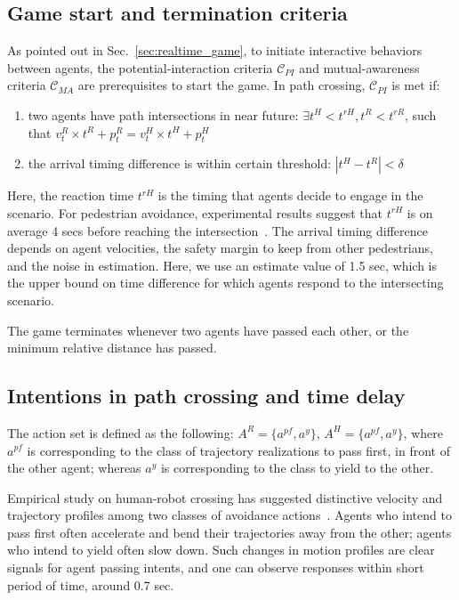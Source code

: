 \documentclass[letterpaper, 10 pt, conference]{ieeeconf}  %
\begin{document}
\subsection{Game start and termination criteria}
\vspace{-.2em}
As pointed out in Sec.~\ref{sec:realtime_game}, to initiate interactive 
behaviors between agents, the potential-interaction criteria $\mathcal{C}_{PI}$ 
and mutual-awareness criteria $\mathcal{C}_{MA}$ are prerequisites to start the 
game. In path crossing, $\mathcal{C}_{PI}$ is met if:
\begin{enumerate}
  \item two agents have path intersections in near future: 
    $\exists t^H<t^{rH}, t^R<t^{rR}$, such that $v^R_t \times t^R + p^R_t = v^H_t \times t^H +p^H_t$
  \item the arrival timing difference is within certain threshold: $|t^H-t^R|<\delta$
\end{enumerate}
Here, the reaction time $t^{rH}$ is the timing that agents decide to 
engage in the scenario. For pedestrian avoidance, experimental results suggest 
that $t^{rH}$ is on average 4 secs before reaching the intersection~\cite{pettre2009experiment}. 
The arrival timing difference depends on agent velocities, the safety margin 
to keep from other pedestrians, and the noise in estimation. Here, we use an 
estimate value of 1.5 sec, which is the upper bound on time difference for 
which agents respond to the intersecting scenario.

The game terminates whenever two agents have passed each other, or the 
minimum relative distance has passed.

\vspace{-.2em}
\subsection{Intentions in path crossing and time delay}
\vspace{-.2em}
The action set is defined as the following: $A^R = \{a^{pf}, a^y\}$, 
$A^H = \{a^{pf},a^y\}$, where $a^{pf}$ is corresponding to the class of 
trajectory realizations to pass first, in front of the other agent; whereas 
$a^y$ is corresponding to the class to yield to the other. 

Empirical study on human-robot crossing has suggested distinctive velocity and 
trajectory profiles among two classes of avoidance 
actions~\cite{paris2007pedestrian}. Agents who intend to pass first often 
accelerate and bend their trajectories away from the other; agents who intend 
to yield often slow down. Such changes in motion profiles are clear 
signals for agent passing intents, and one can observe responses within short period of time, around 0.7 sec.
\end{document}

